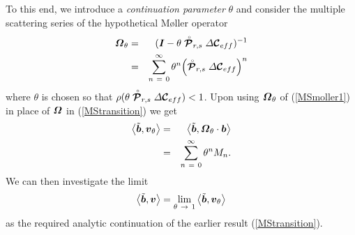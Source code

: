 To this end, we introduce a {\em continuation parameter \/} $\theta$ and 
consider the multiple scattering series of the hypothetical M{\o}ller 
operator
\begin{eqnarray}	\label{MSmoller1}
{\mbox{\boldmath$\mit \Omega$\unboldmath}}_{\theta}&=&({\mbox{\boldmath$\mit I$\unboldmath}}-\theta \stackrel{\scriptscriptstyle _{\,\,\circ}}{ \mbox{\boldmath$\cal P$\unboldmath}}_{r,s} {\mit 
\Delta}{\mbox{\boldmath$\cal C$\unboldmath}}_{eff})^{-1}\nonumber\\
&=&\sum\limits_{  n\ =\ 0}^{ \infty }\theta^{n}{\left({\stackrel{\scriptscriptstyle _{\,\,\circ}}{ \mbox{\boldmath$\cal P$\unboldmath}}_{r,s} 
{\mit \Delta}{\mbox{\boldmath$\cal C$\unboldmath}}_{eff}}\right)}^{n}
\end{eqnarray}
where $\theta$ is chosen so that $\rho (\theta \stackrel{\scriptscriptstyle _{\,\,\circ}}{ \mbox{\boldmath$\cal P$\unboldmath}}_{r,s} {\mit 
\Delta}{\mbox{\boldmath$\cal C$\unboldmath}}_{eff} 
) < 1$. 
Upon using ${\mbox{\boldmath$\mit \Omega$\unboldmath}}_{\theta}$ of (\ref{MSmoller1}) in place 
of ${\mbox{\boldmath$\mit \Omega$\unboldmath}}$ in (\ref{MStransition}) we get
\begin{eqnarray} \label{MStransition2}
\left\langle\tilde{\mbox{\boldmath$\mit b$\unboldmath}},{\mbox{\boldmath$\mit v$\unboldmath}}_{\theta}\right\rangle & = &
\left\langle\tilde{\mbox{\boldmath$\mit b$\unboldmath}},{\mbox{\boldmath$\mit \Omega$\unboldmath}}_{\theta}\cdot{\mbox{\boldmath$\mit b$\unboldmath}}\right\rangle\nonumber\\
&=&\sum\limits_{  n\ =\ 0}^{ \infty } \theta^n {  M}_{  n}.
\end{eqnarray}
We can then investigate the limit
\begin{equation}	\label{transitionlimit}
	\left\langle\tilde{\bmi  b},{\bmi  v}\right\rangle=\lim\limits_{\theta \ 
\rightarrow\ 
	1}\left\langle\tilde{\bmi  b},{\bmi  v}_{\theta}\right\rangle 
\end{equation}
as the required analytic continuation of the earlier result 
(\ref{MStransition}).
 

